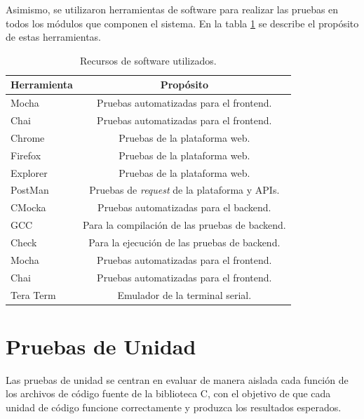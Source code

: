 Asimismo, se utilizaron herramientas de software para realizar las pruebas
en todos los módulos que componen el sistema. En la tabla \ref{tab:RecursosSoftware} se describe el propósito de estas herramientas.

\hfill \break
\hfill \break
\hfill \break
\hfill \break

\begin{table}[h]
	\centering
	\caption[Recursos de software utilizados]{Recursos de software utilizados.}
	\begin{tabular}{l c}    
		\toprule
		\textbf{Herramienta} & \textbf{Propósito}\\
		\midrule
		Mocha &  Pruebas automatizadas para el frontend.\\		
		Chai &   Pruebas automatizadas para el frontend.\\
		Chrome & Pruebas de la plataforma web.\\
		Firefox & Pruebas de la plataforma web.\\
		Explorer &  Pruebas de la plataforma web. \\
		PostMan \citep{Postman} &  Pruebas de \textit{request} de la plataforma y APIs. \\
		CMocka &  Pruebas automatizadas para el backend. \\
		GCC  & Para la compilación de las pruebas de backend. \\
		Check  & Para la ejecución de las pruebas de backend. \\
		Mocha  &  Pruebas automatizadas para el frontend. \\
		Chai  &  Pruebas automatizadas para el frontend. \\
        Tera Term \citep{TeraTerm} &  Emulador de la terminal serial. \\
		\bottomrule
		\hline
	\end{tabular}
	\label{tab:RecursosSoftware}
\end{table}

\section{Pruebas de Unidad} 
\label{subsec:Pruebas de Unidad}  

Las pruebas de unidad se centran en evaluar de manera aislada cada función de los archivos de código fuente de la biblioteca C, con el objetivo de que cada unidad de código funcione correctamente y produzca los resultados esperados. 


